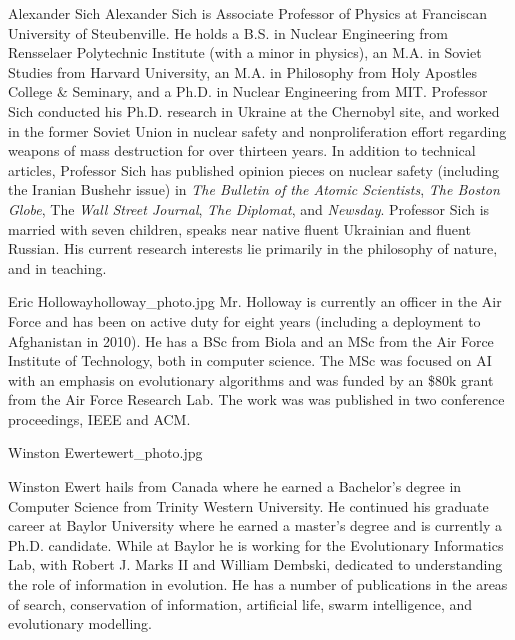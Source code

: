 \begin{authorbio}{Alexander Sich}{}
Alexander Sich is Associate Professor of Physics at Franciscan University of Steubenville. He holds a B.S. in Nuclear Engineering from Rensselaer Polytechnic Institute (with a minor in physics), an M.A. in Soviet Studies from Harvard University, an M.A. in Philosophy from Holy Apostles College \& Seminary, and a Ph.D. in Nuclear Engineering from MIT. Professor Sich conducted his Ph.D. research in Ukraine at the Chernobyl site, and worked in the former Soviet Union in nuclear safety and nonproliferation effort regarding weapons of mass destruction for over thirteen years. In addition to technical articles, Professor Sich has published opinion pieces on nuclear safety (including the Iranian Bushehr issue) in \emph{The Bulletin of the Atomic Scientists}, \emph{The Boston Globe}, The \emph{Wall Street Journal}, \emph{The Diplomat}, and \emph{Newsday}. Professor Sich is married with seven children, speaks near native fluent Ukrainian and fluent Russian. His current research interests lie primarily in the philosophy of nature, and in teaching.
\end{authorbio}

\begin{authorbio}{Eric Holloway}{holloway_photo.jpg}
Mr. Holloway is currently an officer in the Air Force and has been on
active duty for eight years (including a deployment to Afghanistan in
2010). He has a BSc from Biola and an MSc from the Air Force Institute
of Technology, both in computer science. The MSc was focused on AI
with an emphasis on evolutionary algorithms and was funded by an \$80k
grant from the Air Force Research Lab. The work was was published in
two conference proceedings, IEEE and ACM.
\end{authorbio}

\begin{authorbio}{Winston Ewert}{ewert_photo.jpg}

Winston Ewert hails from Canada where he earned a Bachelor's degree in Computer Science from Trinity Western University. He continued his graduate career at Baylor University where he earned a master's degree and is currently a Ph.D. candidate. While at Baylor he is working for the Evolutionary Informatics Lab, with Robert J. Marks II and William Dembski, dedicated to understanding the role of information in evolution. He has a number of publications in the areas of search, conservation of information, artificial life, swarm intelligence, and evolutionary modelling. 
\end{authorbio}


